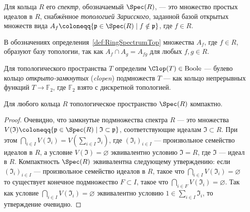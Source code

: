 \documentclass[
	extrafontsizes,
	11pt,
	hyphens,
]{memoir}
\begin{document}
\begin{definition}
\label{def:RingSpectrumTop}
Для кольца \(R\) его \emph{спектр}, обозначаемый \(\Spec(R)\), --- это множество простых идеалов в \(R\), снабжённое \emph{топологией Зарисского}, заданной базой открытых множеств вида \(A_f \coloneqq \{\mathfrak{p} \in \Spec(R) \mid f \notin \mathfrak{p}\}\), где \(f \in R\).
\end{definition}

\begin{remark}
В обозначениях определения~\ref{def:RingSpectrumTop} множества \(A_f\), где \(f \in R\), образуют базу топологии, так как \(A_f \cap A_g = A_{fg}\) для любых \(f, g \in R\).
\end{remark}

\begin{definition}
Для топологического пространства \(T\)
определим $\Clop(T) \in \mathrm{Boole}$ --- булево кольцо \emph{открыто-за\-мкну\-тых} (\emph{clopen}) подмножеств $T$ --- как кольцо непрерывных функций $T \to \mathbb{F}_2$, где $\mathbb{F}_2$ взято с дискретной топологией.
\end{definition}

\begin{theorem}
Для любого кольца \(R\) топологическое пространство \(\Spec(R)\) компактно.
\end{theorem}

\begin{proof}
Очевидно, что замкнутые подмножества спектра $R$ --- это множества
$V(\mathfrak{I}) \coloneqq \{\mathfrak{p} \in \Spec(R) \mid \mathfrak{I} \subset \mathfrak{p}\}$, соответствующие идеалам $\mathfrak{I} \subset R$.
При этом $\bigcap_{i \in I} V(\mathfrak{I}_i) = V(\sum_{i \in I} \mathfrak{I}_i)$, где $(\mathfrak{I}_i)_{i \in I}$ --- произвольное семейство идеалов в $R$, а условие \(V(\mathfrak{I}) = \varnothing\) эквивалентно условию $\mathfrak{I} = R$, где $\mathfrak{I}$ --- идеал в $R$.
Компактность $\Spec(R)$ эквивалентна следующему утверждению: если $(\mathfrak{I}_i)_{i \in I}$ --- произвольное семейство идеалов в $R$, такое что
$\bigcap_{i \in I} V(\mathfrak{I}_i) = \varnothing$ то существует конечное подмножество $F \subset I$, такое что
$\bigcap_{i \in F} V(\mathfrak{I}_i) = \varnothing$.
Так как условие \(\bigcap_{i \in I} V(\mathfrak{I}_i) = \varnothing\) эквивалентно условию \(1 \in \sum_{i \in I} \mathfrak{I}_i\), то утверждение очевидно.
\end{proof}
\end{document}
